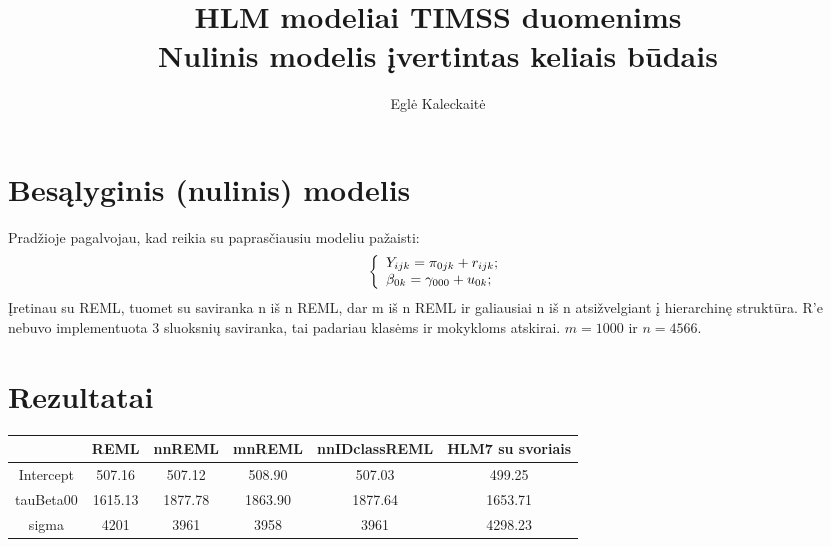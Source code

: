 \documentclass[a4paper]{article}
\title{HLM modeliai TIMSS duomenims\\Nulinis modelis įvertintas keliais būdais}
\author{Eglė Kaleckaitė}
\begin{document}


\maketitle
\section{Besąlyginis (nulinis) modelis}
Pradžioje pagalvojau, kad reikia su paprasčiausiu modeliu pažaisti:
\[ \left\{
  \begin{array}{l l}
    Y_{ijk} = \pi_{0jk}+r_{ijk}; \\
    \beta_{0k} = \gamma_{000} + u_{0k};
  \end{array} \right.\]
Įretinau su REML, tuomet su saviranka n iš n REML, dar m iš n REML ir galiausiai n iš n atsižvelgiant į hierarchinę struktūra. R'e nebuvo implementuota 3 sluoksnių saviranka, tai padariau klasėms ir mokykloms atskirai. $m = 1000$ ir $n = 4566$.
\section{Rezultatai}


\begin{table}[ht]
\centering
\begin{tabular}{cccccc}
  \hline
 & REML & nnREML & mnREML & nnIDclassREML & HLM7 su svoriais\\ 
  \hline
Intercept & 507.16 & 507.12 & 508.90 & 507.03& 499.25\\ 
  tauBeta00 & 1615.13 & 1877.78 & 1863.90 & 1877.64 & 1653.71\\ 
  sigma & 4201 & 3961 & 3958 & 3961 & 4298.23\\ 
   \hline
\end{tabular}
\end{table}
\end{document}
